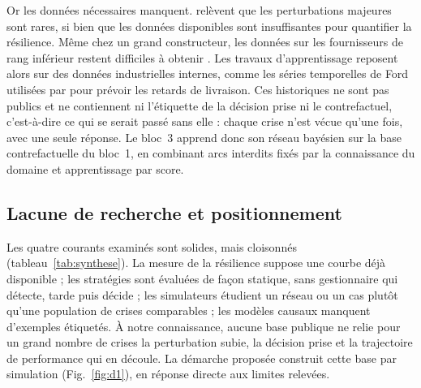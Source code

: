 Or les données nécessaires manquent. \citet{hosseiniivanov2020} relèvent que les perturbations majeures sont rares, si bien que les données disponibles sont insuffisantes pour quantifier la résilience. Même chez un grand constructeur, les données sur les fournisseurs de rang inférieur restent difficiles à obtenir \citep{simchilevi2015}. Les travaux d'apprentissage reposent alors sur des données industrielles internes, comme les séries temporelles de Ford utilisées par \citet{do2024} pour prévoir les retards de livraison. Ces historiques ne sont pas publics et ne contiennent ni l'étiquette de la décision prise ni le contrefactuel, c'est-à-dire ce qui se serait passé sans elle : chaque crise n'est vécue qu'une fois, avec une seule réponse. Le bloc~3 apprend donc son réseau bayésien sur la base contrefactuelle du bloc~1, en combinant arcs interdits fixés par la connaissance du domaine et apprentissage par score.

\subsection{Lacune de recherche et positionnement}
\label{sec:ea-lacune}

Les quatre courants examinés sont solides, mais cloisonnés (tableau~\ref{tab:synthese}). La mesure de la résilience suppose une courbe déjà disponible ; les stratégies sont évaluées de façon statique, sans gestionnaire qui détecte, tarde puis décide ; les simulateurs étudient un réseau ou un cas plutôt qu'une population de crises comparables ; les modèles causaux manquent d'exemples étiquetés. À notre connaissance, aucune base publique ne relie pour un grand nombre de crises la perturbation subie, la décision prise et la trajectoire de performance qui en découle. La démarche proposée construit cette base par simulation (Fig.~\ref{fig:d1}), en réponse directe aux limites relevées.

